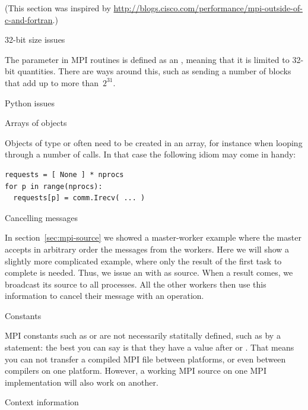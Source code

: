 (This section was inspired by
\url{http://blogs.cisco.com/performance/mpi-outside-of-c-and-fortran}.)


 {32-bit size issues}

The  parameter in MPI routines is defined as an ,
meaning that it is limited to 32-bit quantities.  There are ways
around this, such as sending a number of
 blocks that add up to more than~$2^{31}$.

 {Python issues}
\label{sec:python-stuff}

 {Arrays of objects}

Objects of type  or  often need to be created
in an array, for instance when looping through a number of  calls.
In that case the following idiom may come in handy:
\lstset{language=Python}
\begin{lstlisting}
requests = [ None ] * nprocs
for p in range(nprocs):
  requests[p] = comm.Irecv( ... )
\end{lstlisting}
\lstset{language=C}


 {Cancelling messages}

In section~\ref{sec:mpi-source} we showed a master-worker example where the 
master accepts in arbitrary order the messages from the workers.
Here we will show a slightly
more complicated example, where only the result of the first task to
complete is needed. Thus, we issue an 
with  as source.  When a result comes, we
broadcast its source to all processes.  All the other workers then use
this information to cancel their message with
an  operation.


 {Constants}

MPI constants such as  or  are not
necessarily statitally defined, such as by a  statement:
the best you can say is that they have a value after
 or .
That means you can not transfer a compiled MPI file between
platforms, or even between compilers on one platform.
However, a working MPI source on one MPI implementation
will also work on another.

 {Context information}
\label{sec:context}

